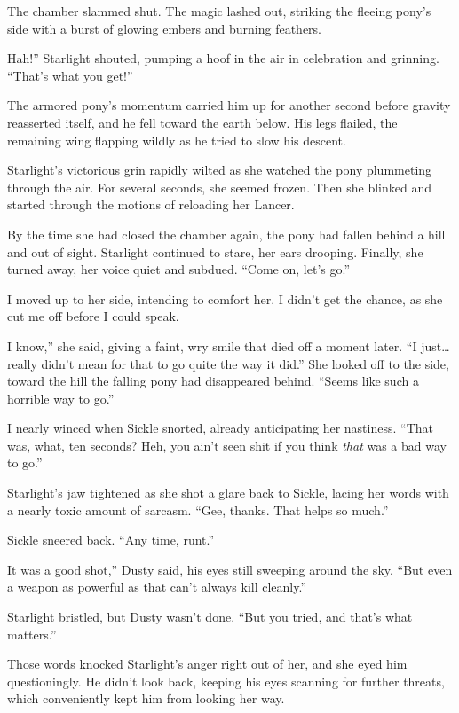 The chamber slammed shut. The magic lashed out, striking the fleeing pony’s side with a burst of glowing embers and burning feathers.

\leavevmode{}Hah!” Starlight shouted, pumping a hoof in the air in celebration and grinning. “That’s what you get!”

The armored pony’s momentum carried him up for another second before gravity reasserted itself, and he fell toward the earth below. His legs flailed, the remaining wing flapping wildly as he tried to slow his descent.

Starlight’s victorious grin rapidly wilted as she watched the pony plummeting through the air. For several seconds, she seemed frozen. Then she blinked and started through the motions of reloading her Lancer.

By the time she had closed the chamber again, the pony had fallen behind a hill and out of sight. Starlight continued to stare, her ears drooping. Finally, she turned away, her voice quiet and subdued. “Come on, let’s go.”

I moved up to her side, intending to comfort her. I didn’t get the chance, as she cut me off before I could speak.

\leavevmode{}I know,” she said, giving a faint, wry smile that died off a moment later. “I just… really didn’t mean for that to go quite the way it did.” She looked off to the side, toward the hill the falling pony had disappeared behind. “Seems like such a horrible way to go.”

I nearly winced when Sickle snorted, already anticipating her nastiness. “That was, what, ten seconds? Heh, you ain’t seen shit if you think \textit{that} was a bad way to go.”

Starlight’s jaw tightened as she shot a glare back to Sickle, lacing her words with a nearly toxic amount of sarcasm. “Gee, thanks. That helps so much.”

Sickle sneered back. “Any time, runt.”

\leavevmode{}It was a good shot,” Dusty said, his eyes still sweeping around the sky. “But even a weapon as powerful as that can’t always kill cleanly.”

Starlight bristled, but Dusty wasn’t done. “But you tried, and that’s what matters.”

Those words knocked Starlight’s anger right out of her, and she eyed him questioningly. He didn’t look back, keeping his eyes scanning for further threats, which conveniently kept him from looking her way.

